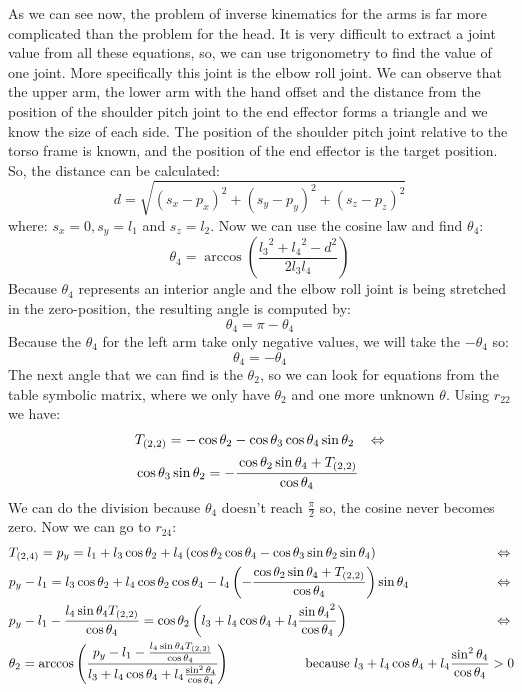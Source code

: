 As we can see now, the problem of inverse kinematics for the arms is far more complicated than the problem for the head. It is very difficult to extract a joint value from all these equations, so, we can use trigonometry to find the value of one joint. More specifically this joint is the elbow roll joint. We can observe that the upper arm, the lower arm with the hand offset and the distance from the position of the shoulder pitch joint to the end effector forms a triangle and we know the size of each side. The position of the shoulder pitch joint relative to the torso frame is known, and the position of the end effector is the target position. So, the distance can be calculated:
\[
d=\sqrt{\left(s_x-p_x\right)^2 + \left(s_y-p_y\right)^2 + \left(s_z-p_z\right)^2}
\]
where: $s_x = 0, s_y = l_1$ and $s_z = l_2$.
Now we can use the cosine law and find $\theta_4$:
\[
\theta_4 = \arccos\left(\frac{{l_3}^2 + {l_4}^2 - d^2}{2l_3l_4}\right)
\]
Because $\theta_4$ represents an interior angle and the elbow roll joint is being stretched in the zero-position, the resulting angle is computed by:
\[
\theta_4 = \pi - \theta_4
\]
Because the $\theta_4$ for the left arm take only negative values, we will take the $-\theta_4$ so:
\[
\theta_4 = - \theta_4
\]
The next angle that we can find is the $\theta_2$, so we can look for equations from the table symbolic matrix, where we only have $\theta_2$ and one more unknown $\theta$. Using $r_{22}$ we have:
\begin{align*}
&T_{(2,2)} = -\cos\theta_2 - \cos\theta_3\cos\theta_4\sin\theta_2 &\Leftrightarrow\\
&\cos\theta_3\sin\theta_2 = -\cfrac{\cos\theta_2\sin\theta_4 + T_{(2,2)}}{\cos\theta_4}
\end{align*}
We can do the division because $\theta_4$ doesn't reach $\frac{\pi}{2} $ so, the cosine never becomes zero. Now we can go to $r_{24}$:
\begin{align*}
&T_{(2,4)} = p_y = l_1 + l_3\cos\theta_2 + l_4\left(\cos\theta_2\cos\theta_4 - \cos\theta_3\sin\theta_2\sin\theta_4\right)&\Leftrightarrow\\
&p_y - l_1 =l_3\cos\theta_2 + l_4\cos\theta_2\cos\theta_4 - l_4\left(-\frac{\cos\theta_2\sin\theta_4 + T_{(2,2)}}{\cos\theta_4}\right)\sin\theta_4&\Leftrightarrow\\
&p_y - l_1 - \frac{l_4\sin\theta_4 T_{(2,2)}}{\cos\theta_4} = \cos\theta_2\left(l_3 + l_4\cos\theta_4 + l_4\frac{{\sin\theta_4}^2}{\cos\theta_4}\right)&\Leftrightarrow\\
&\theta_2 = \arccos\left(\cfrac{p_y - l_1 - \frac{l_4\sin\theta_4 T_{(2,2)}}{\cos\theta_4}}{l_3 + l_4\cos\theta_4 + l_4\frac{\sin^2\theta_4}{\cos\theta_4}}\right) \hspace{2cm} \text{because }   l_3 + l_4\cos\theta_4 + l_4\frac{\sin^2\theta_4}{\cos\theta_4}>0 \hspace{-0.8cm}
\end{align*}
